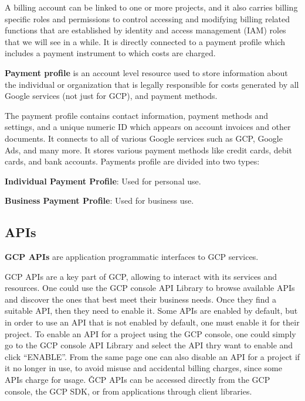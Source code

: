 A billing account can be linked to one or more projects, and it also carries billing specific roles and permissions to
control accessing and modifying billing related functions that are established by identity and access management (IAM)
roles that we will see in a while. It is directly connected to a payment profile which includes a payment instrument
to which costs are charged.

\textbf{Payment profile} is an account level resource used to store information about the individual or organization
that is legally responsible for costs generated by all Google services (not just for GCP), and payment methods.
\ed

The payment profile contains contact information, payment methods and settings, and a unique numeric ID which
appears on account invoices and other documents. It connects to all of various Google services such as GCP, Google
Ads, and many more. It stores various payment methods like credit cards, debit cards, and bank accounts. Payments
profile are divided into two types:
\bit
\item \textbf{Individual Payment Profile}: Used for personal use.
\item \textbf{Business Payment Profile}: Used for business use.
\eit

\subsection{APIs}

\textbf{GCP APIs} are application programmatic interfaces to GCP services.
\ed

GCP APIs are a key part of GCP, allowing to interact with its services and resources. One could use the GCP console
API Library to browse available APIs and discover the ones that best meet their business needs. Once they find a
suitable API, then they need to enable it. Some APIs are enabled by default, but in order to use an API that is not
enabled by default, one must enable it for their project. To enable an API for a project using the GCP console, one
could simply go to the GCP console API Library and select the API thry want to enable and click ``ENABLE''. From the
same page one can also disable an API for a project if it no longer in use, to avoid misuse and accidental billing
charges, since some APIs charge for usage. \v

GCP APIs can be accessed directly from the GCP console, the GCP SDK, or from applications through client libraries.


